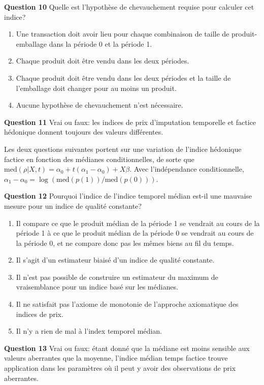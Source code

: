 \documentclass[
]{article}
\begin{document}
\textbf{Question 10} Quelle est l'hypothèse de chevauchement requise pour calculer cet indice?

\begin{enumerate}
\def\labelenumi{\alph{enumi})}
\item
  Une transaction doit avoir lieu pour chaque combinaison de taille de produit-emballage dans la période 0 et la période 1.
\item
  Chaque produit doit être vendu dans les deux périodes.
\item
  Chaque produit doit être vendu dans les deux périodes et la taille de l'emballage doit changer pour au moins un produit.
\item
  Aucune hypothèse de chevauchement n'est nécessaire.
\end{enumerate}

\textbf{Question 11} Vrai ou faux: les indices de prix d'imputation temporelle et factice hédonique donnent toujours des valeurs différentes.

Les deux questions suivantes portent sur une variation de l'indice hédonique factice en fonction des médianes conditionnelles, de sorte que \(\text{med}(\rho | X, t) = \alpha_{0} + t (\alpha_{1} - \alpha_{0}) + X \beta\). Avec l'indépendance conditionnelle, \(\alpha_{1} - \alpha_{0} = \log(\text{med}(p(1)) / \text{med}(p(0)))\).

\textbf{Question 12} Pourquoi l'indice de l'indice temporel médian est-il une mauvaise mesure pour un indice de qualité constante?

\begin{enumerate}
\def\labelenumi{\alph{enumi})}
\item
  Il compare ce que le produit médian de la période 1 se vendrait au cours de la période 1 à ce que le produit médian de la période 0 se vendrait au cours de la période 0, et ne compare donc pas les mêmes biens au fil du temps.
\item
  Il s'agit d'un estimateur biaisé d'un indice de qualité constante.
\item
  Il n'est pas possible de construire un estimateur du maximum de vraisemblance pour un indice basé sur les médianes.
\item
  Il ne satisfait pas l'axiome de monotonie de l'approche axiomatique des indices de prix.
\item
  Il n'y a rien de mal à l'index temporel médian.
\end{enumerate}

\textbf{Question 13} Vrai ou faux: étant donné que la médiane est moins sensible aux valeurs aberrantes que la moyenne, l'indice médian temps factice trouve application dans les paramètres où il peut y avoir des observations de prix aberrantes.
\end{document}
